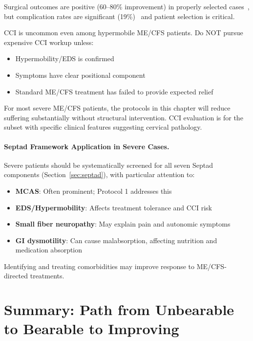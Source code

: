 Surgical outcomes are positive (60--80\% improvement) in properly selected cases~\cite{Henderson2024,Lohkamp2022}, but complication rates are significant (19\%)~\cite{Henderson2024} and patient selection is critical.

\begin{warning}
CCI is uncommon even among hypermobile ME/CFS patients. Do NOT pursue expensive CCI workup unless:
\begin{itemize}
    \item Hypermobility/EDS is confirmed
    \item Symptoms have clear positional component
    \item Standard ME/CFS treatment has failed to provide expected relief
\end{itemize}
For most severe ME/CFS patients, the protocols in this chapter will reduce suffering substantially without structural intervention. CCI evaluation is for the subset with specific clinical features suggesting cervical pathology.
\end{warning}

\paragraph{Septad Framework Application in Severe Cases.}
Severe patients should be systematically screened for all seven Septad components (Section~\ref{sec:septad}), with particular attention to:
\begin{itemize}
    \item \textbf{MCAS}: Often prominent; Protocol 1 addresses this
    \item \textbf{EDS/Hypermobility}: Affects treatment tolerance and CCI risk
    \item \textbf{Small fiber neuropathy}: May explain pain and autonomic symptoms
    \item \textbf{GI dysmotility}: Can cause malabsorption, affecting nutrition and medication absorption
\end{itemize}

Identifying and treating comorbidities may improve response to ME/CFS-directed treatments.

\section{Summary: Path from Unbearable to Bearable to Improving}
\label{sec:summary-path}


